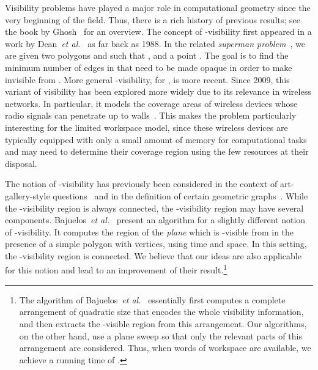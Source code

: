 \documentclass[11pt, a4paper]{article}
\newcommand{\etal}{\emph{et al.}\xspace}
\begin{document}
Visibility problems have played a major role 
in computational geometry since the very beginning
of the field. 
Thus, there is a rich history of previous results;
see the book by Ghosh~\cite{ghosh2007visibility} for 
an overview. The concept of -visibility first appeared 
in a work by Dean~\etal~\cite{dean1988recognizing} as far
back as 1988. In the related 
\emph{superman problem}~\cite{MouawadSh94}, we are
given two polygons  and  such that
, and a point . 
The goal is to find the minimum
number of edges in  that need to be made opaque in
order to make  invisible from . 
More general -visibility, for ,
is more recent. Since 2009, this variant of visibility has been
explored more widely due to its relevance in wireless networks. 
In particular, it 
models the coverage 
areas of wireless devices whose radio signals can penetrate 
up to  walls~\cite{aichholzer2009modem,fabila2009modem}. 
This makes the problem particularly interesting for the 
limited workspace model, since these wireless devices are typically 
equipped with only a small amount of memory for computational tasks 
and may need to determine their coverage region using the 
few resources at their disposal.

The notion of -visibility has previously been considered
in the context of art-gallery-style questions~\cite{ballinger2013coverage,eppstein2007guard,
fulek2009intersecting,
o2012computational} and in the definition
of certain geometric graphs~\cite{dean2005bar,
felsner2008parameters,hartke2007further}.
While the -visibility region is always connected,
the -visibility region may have several components.
Bajuelos~\etal~\cite{bajuelos2012hybrid} present an 
algorithm for a slightly different notion of 
-visibility. It computes the region of the \emph{plane} 
which is -visible from  in the presence of a 
simple polygon  with  vertices, using  
time and  space. In this setting, the 
-visibility region is connected. We believe that our 
ideas are also applicable for this notion and lead to an
improvement of their result.\footnote{The algorithm of 
Bajuelos~\etal~\cite{bajuelos2012hybrid} essentially first computes  
a complete arrangement of quadratic size that encodes the whole 
visibility information, and then extracts the -visible region from 
this arrangement. Our algorithms, on the other hand, use a 
plane sweep so that only the relevant parts of this arrangement are 
considered. Thus, when  words of workspace are available, 
we achieve a running time of .}
\end{document}

